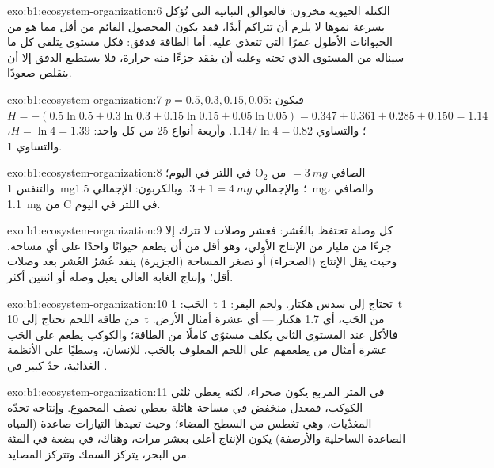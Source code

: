\begin{solution}{exo:b1:ecosystem-organization:6}
الكتلة الحيوية مخزون: فالعوالق النباتية التي تُؤكل بسرعة نموها لا
يلزم أن تتراكم أبدًا، فقد يكون المحصول القائم من  أقل
مما هو من الحيوانات الأطول عمرًا التي تتغذى عليه. أما الطاقة فدفق:
فكل مستوى يتلقى كل ما سيناله من المستوى الذي تحته وعليه أن يفقد
جزءًا منه حرارة، فلا يستطيع الدفق إلا أن يتقلص صعودًا.
\end{solution}

\begin{solution}{exo:b1:ecosystem-organization:7}
$p = 0.5, 0.3, 0.15, 0.05$: فيكون $H = -(0.5\ln 0.5 + 0.3\ln 0.3 + 0.15\ln
0.15 + 0.05\ln 0.05) = 0.347 + 0.361 + 0.285 + 0.150 = 1.14$؛
والتساوي $1.14/\ln 4 = 0.82$. وأربعة أنواع 25 من كل واحد: $H = \ln 4 = 1.39$،
والتساوي 1.
\end{solution}

\begin{solution}{exo:b1:ecosystem-organization:8}
الصافي $= \qty{3}{mg}$ من $\mathrm{O_2}$ في اللتر في اليوم؛ والتنفس
\qty{1}{mg}؛ والإجمالي $3 + 1 = \qty{4}{mg}$. وبالكربون: الإجمالي
\qty{1.5}{mg}، والصافي \qty{1.1}{mg} من C في اللتر في اليوم.
\end{solution}

\begin{solution}{exo:b1:ecosystem-organization:9}
كل وصلة تحتفظ بالعُشر: فعشر وصلات لا تترك إلا جزءًا من مليار من
الإنتاج الأولي، وهو أقل من أن يطعم حيوانًا واحدًا على أي مساحة.
وحيث يقل الإنتاج (الصحراء) أو تصغر المساحة (الجزيرة) ينفد
عُشرُ العُشر بعد وصلات أقل؛ وإنتاج الغابة العالي يعيل وصلة أو
اثنتين أكثر.
\end{solution}

\begin{solution}{exo:b1:ecosystem-organization:10}
الحَب: \qty{1}{t} تحتاج إلى سدس هكتار. ولحم البقر: \qty{1}{t} من طاقة
اللحم تحتاج إلى \qty{10}{t} من الحَب، أي \num{1.7} هكتار --- أي عشرة
أمثال الأرض. فالأكل عند المستوى الثاني يكلف مستوًى كاملًا من الطاقة؛
والكوكب يطعم على الحَب عشرة أمثال من يطعمهم على اللحم المعلوف
بالحَب،  للإنسان، وسطيًا على الأنظمة الغذائية، حدّ
كبير في .
\end{solution}

\begin{solution}{exo:b1:ecosystem-organization:11}
في المتر المربع يكون  صحراء، لكنه يغطي ثلثي
الكوكب، فمعدل منخفض في مساحة هائلة يعطي نصف
المجموع. وإنتاجه تحدّه المغذّيات، وهي تغطس من السطح المضاء؛ وحيث
تعيدها التيارات صاعدة (المياه الصاعدة الساحلية والأرصفة) يكون
الإنتاج أعلى بعشر مرات، وهناك، في بضعة في المئة من البحر، يتركز
السمك وتتركز المصايد.
\end{solution}

